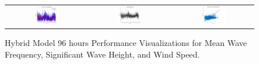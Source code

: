 \begin{figure}[ht!]
\begin{tabular}{ccc}
    \includegraphics[width=0.32\textwidth]{graphs/hybrid/96 hours/wind_speed/actual vs forecast.jpg} &
    \includegraphics[width=0.32\textwidth]{graphs/hybrid/96 hours/wind_speed/residuals.jpg} &
    \includegraphics[width=0.32\textwidth]{graphs/hybrid/96 hours/wind_speed/scatter plot.jpg} \\
  \end{tabular}
  \caption{Hybrid Model 96 hours Performance Visualizations for Mean Wave Frequency, Significant Wave Height, and Wind Speed.}
  \label{fig:hybrid_96_hours}
\end{figure}

